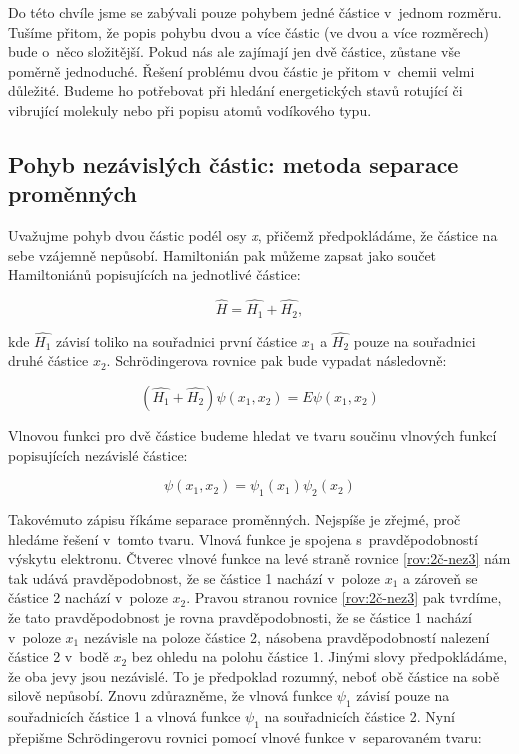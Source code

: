 Do této chvíle jsme se zabývali pouze pohybem jedné částice v~jednom rozměru. Tušíme přitom, že popis pohybu dvou a více částic (ve dvou a více rozměrech) bude o~něco složitější. Pokud nás ale zajímají jen dvě částice, zůstane vše poměrně jednoduché. Řešení problému dvou částic je přitom v~chemii velmi důležité. Budeme ho potřebovat při hledání energetických stavů rotující či vibrující molekuly nebo při popisu atomů vodíkového typu.

\subsection{Pohyb nezávislých částic: metoda separace proměnných}

 Uvažujme pohyb dvou částic podél osy \textit{x}, přičemž předpokládáme, že částice na sebe vzájemně nepůsobí. Hamiltonián pak můžeme zapsat jako součet Hamiltoniánů popisujících na jednotlivé částice:

\begin{equation}
\hat{H}=\hat{H_{1}}+\hat{H_{2}},
\label{rov:2č-nez1}
\end{equation}

\noindent kde $\hat{H_{1}}$ závisí toliko na souřadnici první částice $x_{1}$ a $\hat{H_{2}}$ pouze na souřadnici druhé částice $x_{2}$. Schr\"odingerova rovnice pak bude vypadat následovně:

\begin{equation}
(\hat{H_{1}}+\hat{H_{2}})\psi(x_{1},x_{2})=E\psi(x_{1},x_{2})
\label{rov:2č-nez2}
\end{equation}

Vlnovou funkci pro dvě částice budeme hledat ve tvaru součinu vlnových funkcí popisujících nezávislé částice:

\begin{equation}
\psi(x_{1},x_{2})=\psi_{1}(x_{1})\psi_{2}(x_{2})
\label{rov:2č-nez3}
\end{equation}

Takovémuto zápisu říkáme separace proměnných. Nejspíše je zřejmé, proč hledáme řešení v~tomto tvaru. Vlnová funkce je spojena s~pravděpodobností výskytu elektronu. Čtverec vlnové funkce na levé straně rovnice \ref{rov:2č-nez3} nám tak udává pravděpodobnost, že se částice 1 nachází v~poloze $x_{1}$ a zároveň se částice 2 nachází v~poloze $x_{2}$. Pravou stranou rovnice \ref{rov:2č-nez3} pak tvrdíme, že tato pravděpodobnost je rovna pravděpodobnosti, že se částice 1 nachází v~poloze  $x_{1}$ nezávisle na poloze částice 2, násobena pravděpodobností nalezení částice 2 v~bodě $x_{2}$ bez ohledu na polohu částice 1. Jinými slovy předpokládáme, že oba jevy jsou nezávislé. To je předpoklad rozumný, neboť obě částice na sobě silově nepůsobí. Znovu zdůrazněme, že vlnová funkce $\psi_{1}$ závisí pouze na souřadnicích částice 1 a vlnová funkce $\psi_{1}$ na souřadnicích částice 2. Nyní přepišme Schr\"odingerovu rovnici pomocí vlnové funkce v~separovaném tvaru:


